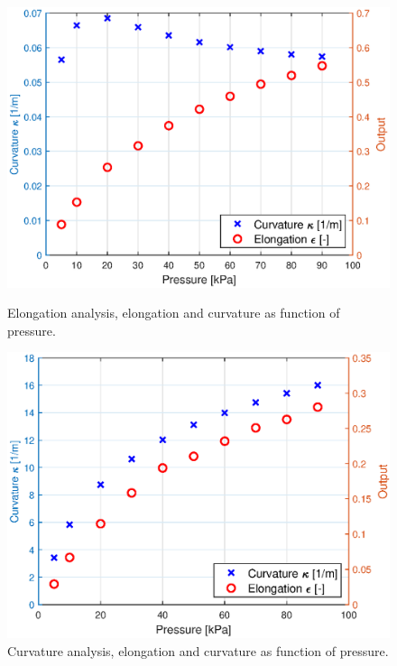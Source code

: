 \begin{figure}[H]
    \centering
\begin{minipage}{0.5\textwidth}
        \centering
        \includegraphics[width=\textwidth]{Figures/Chapter3/elongationvspressure.eps} 
        \caption{Elongation analysis, elongation and curvature as function of pressure.}
        \label{fig3:elongationvspressure}
    \end{minipage}\hfill
    \begin{minipage}{0.5\textwidth}
        \centering
        \includegraphics[width=\textwidth]{Figures/Chapter3/rotationvspressure.eps} 
        \caption{Curvature analysis, elongation and curvature as function of pressure.}
        \label{fig3:rotationvspressure}
    \end{minipage}
\end{figure}


